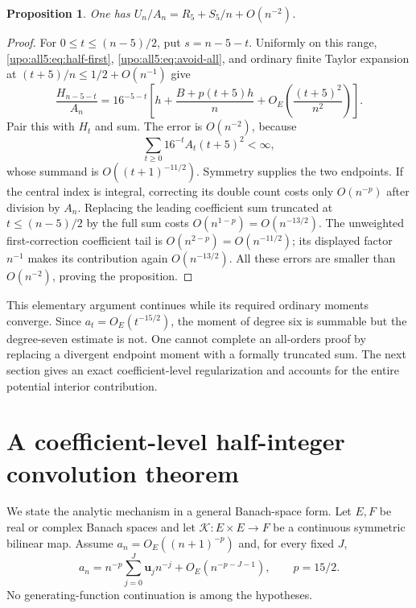 \documentclass[11pt,letterpaper]{article}
\newtheorem{proposition}[theorem]{Proposition}
\theoremstyle{remark}\newtheorem{remark}[theorem]{Remark}
\numberwithin{equation}{section}
\newcommand{\bfU}{\boldsymbol u}
\begin{document}
\begin{proposition}\label{upo:all5:prop:first-ratio}
One has $U_n/A_n=R_5+S_5/n+O(n^{-2})$.
\end{proposition}
\begin{proof}
For $0\le t\le(n-5)/2$, put $s=n-5-t$. Uniformly on this range,
\eqref{upo:all5:eq:half-first}, \eqref{upo:all5:eq:avoid-all}, and ordinary finite Taylor
expansion at $(t+5)/n\le1/2+O(n^{-1})$ give
\begin{equation}\label{upo:all5:eq:endpoint-first}
 \frac{H_{n-5-t}}{A_n}
 =16^{-5-t}\left[h+\frac{B+p(t+5)h}{n}
                   +O_E\left(\frac{(t+5)^2}{n^2}\right)\right].
\end{equation}
Pair this with $H_t$ and sum. The error is $O(n^{-2})$, because
\[
 \sum_{t\ge0}16^{-t}A_t(t+5)^2<\infty,
\]
whose summand is $O((t+1)^{-11/2})$. Symmetry supplies the two
endpoints. If the central index is integral, correcting its double
count costs only $O(n^{-p})$ after division by $A_n$.
Replacing the leading coefficient sum truncated at $t\le(n-5)/2$
by the full sum costs $O(n^{1-p})=O(n^{-13/2})$.
The unweighted first-correction coefficient tail is
$O(n^{2-p})=O(n^{-11/2})$; its displayed factor $n^{-1}$ makes its
contribution again $O(n^{-13/2})$. All these errors are smaller
than $O(n^{-2})$, proving the proposition.
\end{proof}

This elementary argument continues while its required ordinary
moments converge. Since $a_t=O_E(t^{-15/2})$, the moment of degree
six is summable but the degree-seven estimate is not. One cannot
complete an all-orders proof by replacing a divergent endpoint
moment with a formally truncated sum. The next section gives an
exact coefficient-level regularization and accounts for the entire
potential interior contribution.

\section{A coefficient-level half-integer convolution theorem}\label{upo:all5:sec:convolution}
We state the analytic mechanism in a general Banach-space form.
Let $E,F$ be real or complex Banach spaces and let
$\mathcal K:E\times E\to F$ be a continuous symmetric bilinear map.
Assume $a_n=O_E((n+1)^{-p})$ and, for every fixed $J$,
\begin{equation}\label{upo:all5:eq:abstract-input}
 a_n=n^{-p}\sum_{j=0}^J\bfU_j n^{-j}
                          +O_E(n^{-p-J-1}),\qquad p=15/2.
\end{equation}
No generating-function continuation is among the hypotheses.
\end{document}
